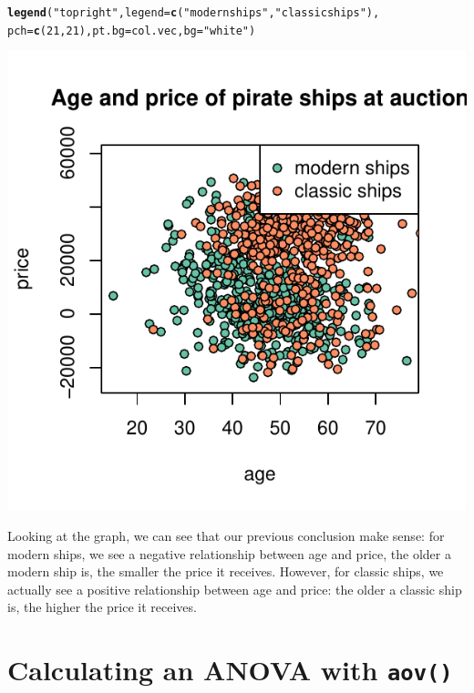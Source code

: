 \documentclass{tufte-book}\usepackage[]{graphicx}\usepackage[]{color}
\makeatletter
\def\maxwidth{ %
  \ifdim\Gin@nat@width>\linewidth
    \linewidth
  \else
    \Gin@nat@width
  \fi
}
\newcommand{\hlnum}[1]{\textcolor[rgb]{0.686,0.059,0.569}{#1}}%
\newcommand{\hlstr}[1]{\textcolor[rgb]{0.192,0.494,0.8}{#1}}%
\newcommand{\hlstd}[1]{\textcolor[rgb]{0.345,0.345,0.345}{#1}}%
\newcommand{\hlkwc}[1]{\textcolor[rgb]{0.333,0.667,0.333}{#1}}%
\newcommand{\hlkwd}[1]{\textcolor[rgb]{0.737,0.353,0.396}{\textbf{#1}}}%
\newenvironment{kframe}{%
 \def\at@end@of@kframe{}%
 \ifinner\ifhmode%
  \def\at@end@of@kframe{\end{minipage}}%
  \begin{minipage}{\columnwidth}%
 \fi\fi%
 \def\FrameCommand##1{\hskip\@totalleftmargin \hskip-\fboxsep
 \colorbox{shadecolor}{##1}\hskip-\fboxsep
     \hskip-\linewidth \hskip-\@totalleftmargin \hskip\columnwidth}%
 \MakeFramed {\advance\hsize-\width
   \@totalleftmargin\z@ \linewidth\hsize
   \@setminipage}}%
 {\par\unskip\endMakeFramed%
 \at@end@of@kframe}
\newenvironment{knitrout}{}{} %
\makeatother
\begin{document}
\begin{marginfigure}
\begin{tiny}
\begin{knitrout}
\begin{kframe}
\begin{alltt}
\hlkwd{legend}\hlstd{(}\hlstr{"topright"}\hlstd{,} \hlkwc{legend} \hlstd{=} \hlkwd{c}\hlstd{(}\hlstr{"modern ships"}\hlstd{,} \hlstr{"classic ships"}\hlstd{),}
       \hlkwc{pch} \hlstd{=} \hlkwd{c}\hlstd{(}\hlnum{21}\hlstd{,} \hlnum{21}\hlstd{),} \hlkwc{pt.bg} \hlstd{= col.vec,} \hlkwc{bg} \hlstd{=} \hlstr{"white"}\hlstd{)}
\end{alltt}
\end{kframe}
\includegraphics[width=\maxwidth]{figure/unnamed-chunk-281-1} 

\end{knitrout}
\end{tiny}
\end{marginfigure}

Looking at the graph, we can see that our previous conclusion make sense: for modern ships, we see a negative relationship between age and price, the older a modern ship is, the smaller the price it receives. However, for classic ships, we actually see a positive relationship between age and price: the older a classic ship is, the higher the price it receives.


\section{Calculating an ANOVA with \texttt{aov()}}
\end{document}
